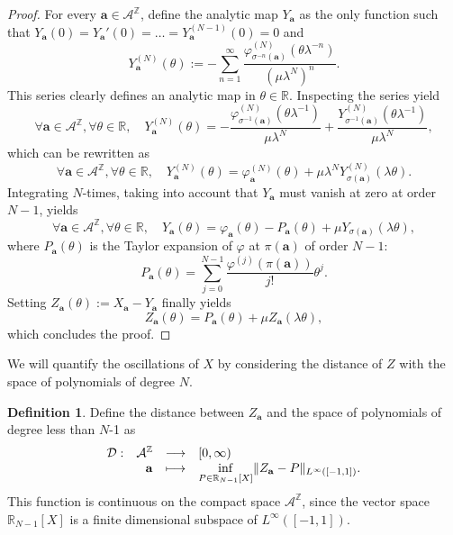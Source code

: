 \documentclass[11pt]{amsart}
\theoremstyle{plain}
\theoremstyle{definition}
\newtheorem{definition}[theorem]{Definition}
\numberwithin{equation}{section}
\begin{document}
\begin{proof}
For every $\mathbf{a} \in \mathcal{A}^\mathbb{Z}$, define the analytic map $Y_\mathbf{a}$ as the only function such that $Y_{\mathbf{a}}(0)=Y_{\mathbf{a}}'(0)=\dots = Y_{\mathbf{a}}^{(N-1)}(0) = 0$ and $$Y_{\mathbf{a}}^{(N)}(\theta) := -\sum_{n=1}^\infty \frac{\varphi_{ \sigma^{-n} (\mathbf{a})}^{(N)}(\theta \lambda^{-n}) }{(\mu \lambda^N)^n} .$$ This series clearly defines an analytic map in $\theta \in \mathbb{R}$. Inspecting the series yield $$ \forall \mathbf{a} \in \mathcal{A}^\mathbb{Z}, \forall \theta \in \mathbb{R}, \quad  Y_{\mathbf{a}}^{(N)}(\theta) = - \frac{\varphi^{(N)}_{ \sigma^{-1}(\mathbf{a})}(\theta \lambda^{-1})}{\mu \lambda^N} + \frac{Y^{(N)}_{ \sigma^{-1}(\mathbf{a})}(\theta \lambda^{-1})}{\mu \lambda^N},$$
which can be rewritten as
$$ \forall \mathbf{a} \in \mathcal{A}^\mathbb{Z}, \forall \theta \in \mathbb{R}, \quad  Y_{\mathbf{a}}^{(N)}(\theta) =  {\varphi^{(N)}_{ \mathbf{a}}(\theta)} + \mu \lambda^N {Y^{(N)}_{ \sigma(\mathbf{a})}(\lambda \theta)}.$$
Integrating $N$-times, taking into account that $Y_\mathbf{a}$ must vanish at zero at order $N-1$, yields
$$ \forall \mathbf{a} \in \mathcal{A}^\mathbb{Z}, \forall \theta \in \mathbb{R}, \quad  Y_{\mathbf{a}}(\theta) =  {\varphi_{ \mathbf{a}}(\theta)} - P_\mathbf{a}(\theta) + \mu {Y_{ \sigma(\mathbf{a})}(\lambda \theta)} ,$$
where $P_\mathbf{a}(\theta)$ is the Taylor expansion of $\varphi$ at $\pi(\mathbf{a})$ of order $N-1$: $$ P_\mathbf{a}(\theta) = \sum_{j=0}^{N-1}  \frac{\varphi^{(j)}(\pi(\mathbf{a}))}{j!} \theta^j .$$
Setting $Z_\mathbf{a}(\theta) := X_\mathbf{a}-Y_\mathbf{a}$ finally yields $$ Z_{\mathbf{a}}(\theta) = P_\mathbf{a}(\theta) + \mu Z_\mathbf{a}(\lambda \theta), $$
which concludes the proof.
\end{proof}

We will quantify the oscillations of $X$ by considering the distance of $Z$ with the space of polynomials of degree $N$.

\begin{definition}
Define the distance between $Z_\mathbf{a}$ and the space of polynomials of degree less than $N$-1 as $$ \begin{array}[t]{lrcl}
\mathcal{D} : & \mathcal{A}^\mathbb{Z} & \longrightarrow & [0,\infty) \\
    & \mathbf{a}  & \longmapsto &  \underset{P \in \mathbb{R}_{N-1}[X]}{\inf} \| Z_\mathbf{a} - P \|_{L^\infty([-1,1])}. \end{array} $$
This function is continuous on the compact space $\mathcal{A}^\mathbb{Z}$, since the vector space $\mathbb{R}_{N-1}[X]$ is a finite dimensional subspace of $L^\infty([-1,1])$.
\end{definition}
\end{document}
